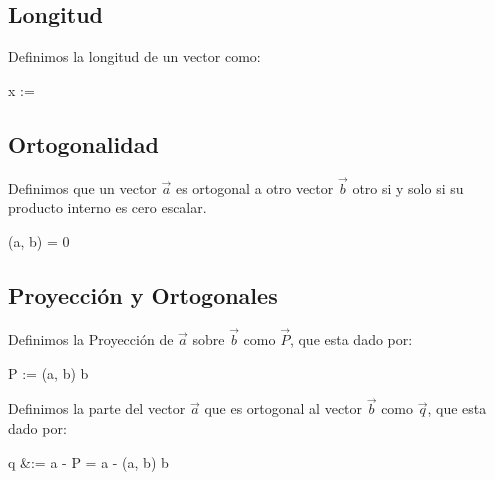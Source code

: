\documentclass[12pt, fleqn]{report}                             %
\def \Eq {equation}                                             %
\newenvironment{MultiLineEquation*}[1]                          %
        {\begin{\Eq*}\begin{alignedat}{#1}}                         %
        {\end{alignedat}\end{\Eq*}}                                 %
\theoremstyle{break}                                            %
\newcommand{\Abs}[1]    {\left\lVert #1 \right\lVert}           %
\begin{document}
            \subsection{Longitud}

                Definimos la longitud de un vector como:
                \begin{MultiLineEquation*}{3}
                    \Abs{\vec x} := 
                \end{MultiLineEquation*}

            \subsection{Ortogonalidad}

                Definimos que un vector $\vec a$ es ortogonal a otro vector $\vec b$ otro si y solo si su producto interno es cero escalar.
                \begin{MultiLineEquation*}{3}
                    (\vec a, \vec b) = 0
                \end{MultiLineEquation*}

            \subsection{Proyección y Ortogonales}

                Definimos la Proyección de $\vec a$ sobre $\vec b$ como $\vec P$, que esta dado por:
                \begin{MultiLineEquation*}{3}
                    \vec P :=
                     \; (\vec a, \vec b) \; \vec b
                \end{MultiLineEquation*}

                Definimos la parte del vector $\vec a$ que es ortogonal al vector $\vec b$ como $\vec q$, que esta dado por:
                \begin{MultiLineEquation*}{3}
                    \vec q 
                    &:= \vec a - \vec P                                                        
                    = \vec a -  \; (\vec a, \vec b) \; \vec b
                \end{MultiLineEquation*}
\end{document}
